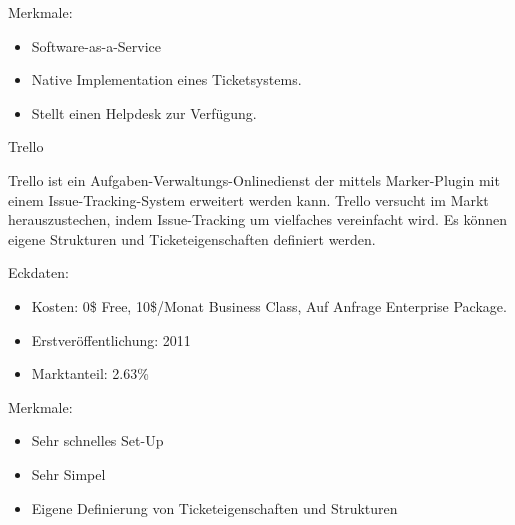 				Merkmale:
				\begin{itemize}
					\item Software-as-a-Service
					\item Native Implementation eines Ticketsystems.
					\item Stellt einen Helpdesk zur Verfügung.
				\end{itemize}
				
				
				
				Trello
				
				Trello ist ein Aufgaben-Verwaltungs-Onlinedienst der mittels Marker-Plugin mit einem Issue-Tracking-System erweitert werden kann. Trello versucht im Markt herauszustechen, indem Issue-Tracking um vielfaches vereinfacht wird. Es können eigene Strukturen und Ticketeigenschaften definiert werden. 
				
					Eckdaten:
				\begin{itemize}
					\item Kosten: 0\$ Free, 10\$/Monat Business Class, Auf Anfrage Enterprise Package.
					\item Erstveröffentlichung: 2011
					\item Marktanteil: 2.63\%
				\end{itemize}
				
				Merkmale:
				\begin{itemize}
					\item Sehr schnelles Set-Up
					\item Sehr Simpel
					\item Eigene Definierung von Ticketeigenschaften und Strukturen
				\end{itemize}
				
				